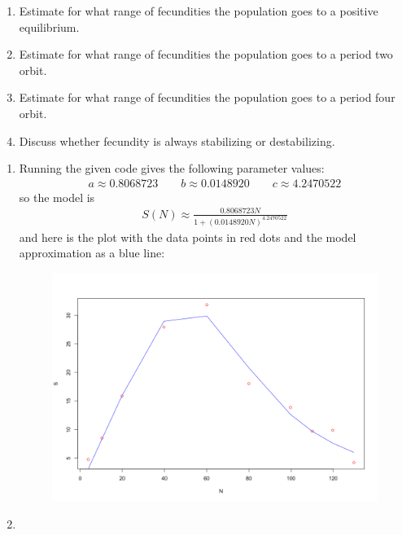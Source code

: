 \documentclass{article} %
\theoremstyle{plain}
\numberwithin{equation}{section} %
\numberwithin{figure}{section} %
\numberwithin{table}{section} %
\begin{document}
{\begin{enumerate}[\ \ (a)]
    \begin{enumerate}[\ \ (i)]
        \item Estimate for what range of fecundities the population goes to a positive equilibrium.
        \item Estimate for what range of fecundities the population goes to a period two orbit.
        \item Estimate for what range of fecundities the population goes to a period four orbit.
        \item Discuss whether fecundity is always stabilizing or destabilizing.
    \end{enumerate}
\end{enumerate}}

\begin{enumerate}[\ \ (a)]
    \item
        Running the given code gives the following parameter values:
        \begin{align*}
            a \approx 0.8068723 \qquad b \approx 0.0148920 \qquad c \approx 4.2470522
        \end{align*}
        so the model is
        \begin{align*}
            S(N) \approx \frac{0.8068723N}{1 + (0.0148920N)^{4.2470522}}
        \end{align*}
        and here is the plot with the data points in red dots and the model approximation as a blue line:
        \begin{figure}[ht!]
            \centering
            \includegraphics[scale=0.3]{4a.png}
        \end{figure}
    \item

\end{enumerate}
\end{document}
